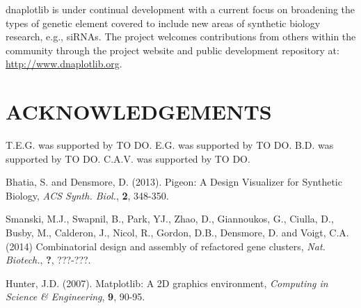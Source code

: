 \documentclass{bioinfo}
\begin{document}
dnaplotlib is under continual development with a current focus on broadening the types of genetic element covered to include new areas of synthetic biology research, e.g., siRNAs. The project welcomes contributions from others within the community through the project website and public development repository at: \href{http://www.dnaplotlib.org}{http://www.dnaplotlib.org}.

\section*{ACKNOWLEDGEMENTS}
T.E.G. was supported by TO DO. E.G. was supported by TO DO. B.D. was supported by TO DO. C.A.V. was supported by TO DO.

\begin{thebibliography}{}
	
 Bhatia, S. and Densmore, D. (2013). Pigeon: A Design Visualizer for Synthetic Biology, {\it ACS Synth. Biol.}, {\bf 2}, 348-350.

 Smanski, M.J., Swapnil, B., Park, YJ., Zhao, D., Giannoukos, G., Ciulla, D., Busby, M., Calderon, J., Nicol, R., Gordon, D.B., Densmore, D. and Voigt, C.A. (2014) Combinatorial design and assembly of refactored gene clusters, {\it Nat. Biotech.}, {\bf ?}, ???-???.

 Hunter, J.D. (2007). Matplotlib: A 2D graphics environment, {\it Computing in Science \& Engineering}, {\bf 9}, 90-95.




\end{thebibliography}
\end{document}
